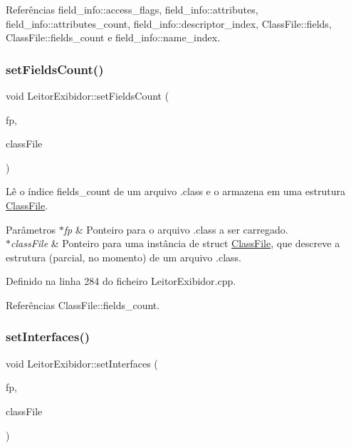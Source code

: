 Referências field\+\_\+info\+::access\+\_\+flags, field\+\_\+info\+::attributes, field\+\_\+info\+::attributes\+\_\+count, field\+\_\+info\+::descriptor\+\_\+index, Class\+File\+::fields, Class\+File\+::fields\+\_\+count e field\+\_\+info\+::name\+\_\+index.

\mbox{\label{classLeitorExibidor_af325d9f6276a66c6bac95b09e83405c9}} 
\subsubsection{\texorpdfstring{set\+Fields\+Count()}{setFieldsCount()}}
{\footnotesize\ttfamily void Leitor\+Exibidor\+::set\+Fields\+Count (\begin{DoxyParamCaption}\item[{F\+I\+LE $\ast$}]{fp,  }\item[{\hyperlink{classClassFile}{Class\+File} $\ast$}]{class\+File }\end{DoxyParamCaption})\hspace{0.3cm}{\ttfamily [private]}}

Lê o índice fields\+\_\+count de um arquivo .class e o armazena em uma estrutura \hyperlink{classClassFile}{Class\+File}. 
\begin{DoxyParams}{Parâmetros}
{\em $\ast$fp} & Ponteiro para o arquivo .class a ser carregado. \\
\hline
{\em $\ast$class\+File} & Ponteiro para uma instância de struct \hyperlink{classClassFile}{Class\+File}, que descreve a estrutura (parcial, no momento) de um arquivo .class. \\
\hline
\end{DoxyParams}


Definido na linha 284 do ficheiro Leitor\+Exibidor.\+cpp.



Referências Class\+File\+::fields\+\_\+count.

\mbox{\label{classLeitorExibidor_aff26e69a60fa1285388e300ac7ec3342}} 
\subsubsection{\texorpdfstring{set\+Interfaces()}{setInterfaces()}}
{\footnotesize\ttfamily void Leitor\+Exibidor\+::set\+Interfaces (\begin{DoxyParamCaption}\item[{F\+I\+LE $\ast$}]{fp,  }\item[{\hyperlink{classClassFile}{Class\+File} $\ast$}]{class\+File }\end{DoxyParamCaption})\hspace{0.3cm}{\ttfamily [private]}}

